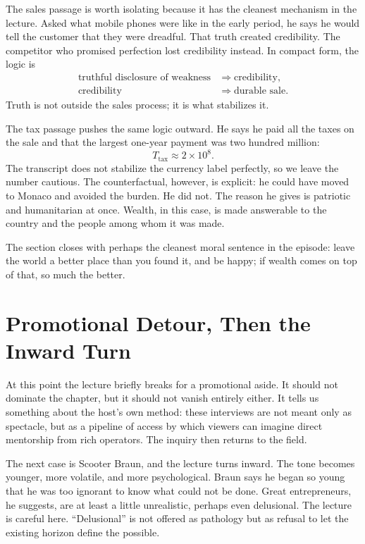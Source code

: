 The sales passage is worth isolating because it has the cleanest mechanism in the lecture. Asked what mobile phones were like in the early period, he says he would tell the customer that they were dreadful. That truth created credibility. The competitor who promised perfection lost credibility instead. In compact form, the logic is
\begin{align}
\text{truthful disclosure of weakness} &\Longrightarrow \text{credibility},\\
\text{credibility} &\Longrightarrow \text{durable sale}.
\end{align}
Truth is not outside the sales process; it is what stabilizes it.

The tax passage pushes the same logic outward. He says he paid all the taxes on the sale and that the largest one-year payment was two hundred million:
\begin{equation}
T_{\text{tax}} \approx 2 \times 10^{8}.
\end{equation}
The transcript does not stabilize the currency label perfectly, so we leave the number cautious. The counterfactual, however, is explicit: he could have moved to Monaco and avoided the burden. He did not. The reason he gives is patriotic and humanitarian at once. Wealth, in this case, is made answerable to the country and the people among whom it was made.

The section closes with perhaps the cleanest moral sentence in the episode: leave the world a better place than you found it, and be happy; if wealth comes on top of that, so much the better.

\section{Promotional Detour, Then the Inward Turn}

At this point the lecture briefly breaks for a promotional aside. It should not dominate the chapter, but it should not vanish entirely either. It tells us something about the host's own method: these interviews are not meant only as spectacle, but as a pipeline of access by which viewers can imagine direct mentorship from rich operators. The inquiry then returns to the field.

The next case is Scooter Braun, and the lecture turns inward. The tone becomes younger, more volatile, and more psychological. Braun says he began so young that he was too ignorant to know what could not be done. Great entrepreneurs, he suggests, are at least a little unrealistic, perhaps even delusional. The lecture is careful here. ``Delusional'' is not offered as pathology but as refusal to let the existing horizon define the possible.

